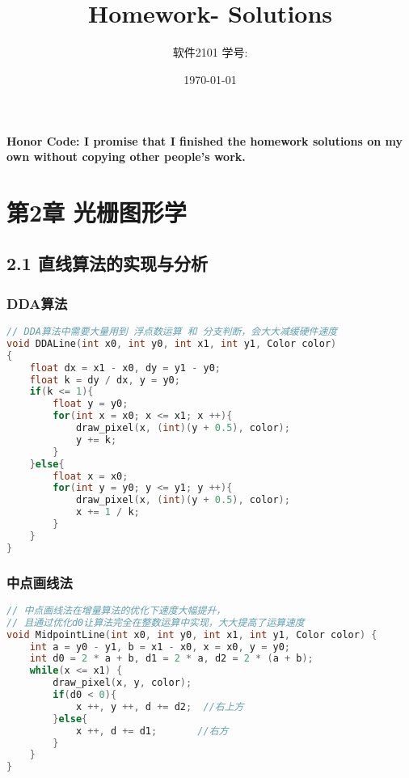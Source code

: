 \documentclass[11pt]{article}  %
\title{\vspace{-4cm}\CourseCodeName \space
        \Session \protect\\  Homework-\textbf{\Homework} Solutions}
\author{软件2101 \Name \space 学号: \SID}
\date{\today}
\begin{document}
\maketitle

\textbf{Honor Code: I promise that I finished the homework solutions on my own without copying other people's 
    work.}

\section*{第2章 光栅图形学}

\subsection*{2.1 直线算法的实现与分析}

\subsubsection*{DDA算法}

\begin{lstlisting}[language = C]
// DDA算法中需要大量用到 浮点数运算 和 分支判断，会大大减缓硬件速度
void DDALine(int x0, int y0, int x1, int y1, Color color)
{		
	float dx = x1 - x0, dy = y1 - y0;
    float k = dy / dx, y = y0;
    if(k <= 1){
        float y = y0;
        for(int x = x0; x <= x1; x ++){
            draw_pixel(x, (int)(y + 0.5), color);
	        y += k;
        }
    }else{
        float x = x0;
        for(int y = y0; y <= y1; y ++){
            draw_pixel(x, (int)(y + 0.5), color);		   
	        x += 1 / k;
        }
    }
}
\end{lstlisting}

\subsubsection*{中点画线法}

\begin{lstlisting}[language = C]
// 中点画线法在增量算法的优化下速度大幅提升，
// 且通过优化d0让算法完全在整数运算中实现，大大提高了运算速度
void MidpointLine(int x0, int y0, int x1, int y1, Color color) {
    int a = y0 - y1, b = x1 - x0, x = x0, y = y0;
    int d0 = 2 * a + b, d1 = 2 * a, d2 = 2 * (a + b);
    while(x <= x1) {
        draw_pixel(x, y, color);
        if(d0 < 0){
            x ++, y ++, d += d2;  //右上方
        }else{
            x ++, d += d1;       //右方
        }
    }
}
\end{lstlisting}
\end{document}
